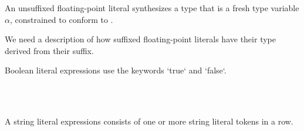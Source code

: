 \begin{Description}
An unsuffixed floating-point literal synthesizes a type that is a fresh type variable $\alpha$, constrained to conform to .
\end{Description}

\begin{Incomplete}
We need a description of how suffixed floating-point literals have their type derived from their suffix.
\end{Incomplete}
    

\begin{Description}
    Boolean literal expressions use the keywords `true` and `false`.
\end{Description}
    
\begin{Syntax}
         \SynOr {}
\end{Syntax}

\begin{Checking}
	\\
	\\
\end{Checking}



\begin{Description}
A string literal expressions consists of one or more string literal tokens in a row.
\end{Description}

\begin{Syntax}
        \SynPlus
\end{Syntax}

\begin{Checking}
	\\
\end{Checking}


\begin{Syntax}
	 \\
         \\
        \SynOr {}  \\
\end{Syntax}

